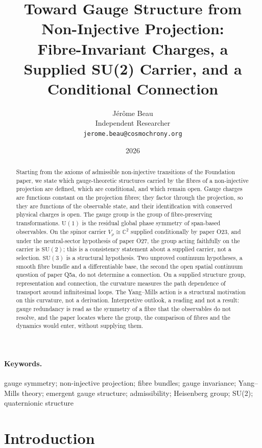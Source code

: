 \documentclass[11pt,a4paper]{article}
\title{Toward Gauge Structure from Non-Injective Projection:\\
Fibre-Invariant Charges, a Supplied SU(2) Carrier, and a Conditional Connection}
\author{J\'er\^ome Beau\\
\small Independent Researcher\\
\small \texttt{jerome.beau@cosmochrony.org}}
\date{2026}
\begin{document}
  \maketitle

  \begin{abstract}
    Starting from the axioms of admissible non-injective transitions of the Foundation paper, we
    state which gauge-theoretic structures carried by the fibres of a non-injective projection are
    defined, which are conditional, and which remain open.
    Gauge charges are functions constant on the projection fibres; they factor through the
    projection, so they are functions of the observable state, and their identification with
    conserved physical charges is open.
    The gauge group is the group of fibre-preserving transformations.
    $\mathrm{U}(1)$ is the residual global phase symmetry of span-based observables.
    On the spinor carrier $V_\rho \cong \mathbb{C}^2$ supplied conditionally by paper O23, and
    under the neutral-sector hypothesis of paper O27, the group acting faithfully on the carrier is
    $\mathrm{SU}(2)$; this is a consistency statement about a supplied carrier, not a selection.
    $\mathrm{SU}(3)$ is a structural hypothesis.
    Two unproved continuum hypotheses, a smooth fibre bundle and a differentiable base, the second
    the open spatial continuum question of paper Q5a, do not determine a connection.
    On a supplied structure group, representation and connection, the curvature measures the path
    dependence of transport around infinitesimal loops.
    The Yang--Mills action is a structural motivation on this curvature, not a derivation.
    Interpretive outlook, a reading and not a result: gauge redundancy is read as the symmetry of a
    fibre that the observables do not resolve, and the paper locates where the group, the
    comparison of fibres and the dynamics would enter, without supplying them.
  \end{abstract}

  \paragraph{Keywords.}
    gauge symmetry; non-injective projection; fibre bundles; gauge invariance; Yang–Mills theory; emergent gauge
    structure; admissibility; Heisenberg group; SU(2); quaternionic structure

    \clearpage
    \tableofcontents

    \clearpage
  \section{Introduction}
  \label{sec:intro}
\end{document}

